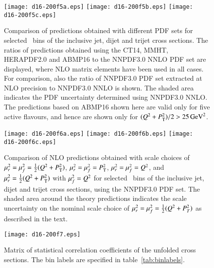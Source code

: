 \documentclass[12pt]{article}
\begin{document}
\begin{figure}[htb]
\begin{center}
   \texttt{[image: d16-200f5a.eps]}
   \texttt{[image: d16-200f5b.eps]}
   \texttt{[image: d16-200f5c.eps]}
\end{center}
\caption{
  Comparison of predictions obtained with different PDF sets for selected \Qsq\ bins of the inclusive jet, dijet
  and trijet cross sections.
  The ratios of
  predictions obtained using 
  the CT14, MMHT, HERAPDF2.0 and ABMP16 to the NNPDF3.0 NNLO PDF set are displayed, where NLO matrix elements have been used in all cases.
  For comparison, also the ratio of NNPDF3.0 PDF set extracted at NLO precision  to NNPDF3.0 NNLO is shown.
  The shaded area indicates the PDF uncertainty determined using NNPDF3.0 NNLO.
  The predictions based on ABMP16 shown here are valid only for five active flavours, and hence are shown only for $(Q^2 + \pt^{2})/2>25\,\text{GeV}^2$. 
}
\label{figPDFs}
\end{figure}


\begin{figure}[htb]
\begin{center}
   \texttt{[image: d16-200f6a.eps]}
   \texttt{[image: d16-200f6b.eps]}
   \texttt{[image: d16-200f6c.eps]}
\end{center}
\caption{
  Comparison of NLO predictions obtained with scale choices of $\mur^2=\muf^2=\tfrac{1}{2}(\Qsq+\pt^2)$, $\mur^2=\muf^2=\pt^2$, $\mur^2=\muf^2=\Qsq$, 
and $\mur^2=\tfrac{1}{2}(\Qsq+\pt^2)$ with $\muf^2=\Qsq$ for selected \Qsq\ bins of the inclusive jet, dijet
  and trijet cross sections,
  using the NNPDF3.0 PDF set.
  The shaded area around the theory predictions indicates the scale uncertainty on the nominal scale choice of $\mur^2 = \muf^2 = \tfrac{1}{2}(Q^{2}+ P_{T}^2)$ as described in the text.
}
\label{figScales}
\end{figure}





\begin{figure}
  \centering
  \texttt{[image: d16-200f7.eps]}
  \caption{
    Matrix of statistical correlation coefficients of the unfolded cross sections.
    The bin labels are specified in table~\ref{tab:binlabels}.
  }
  \label{figCorrelations}
\end{figure}
\end{document}
